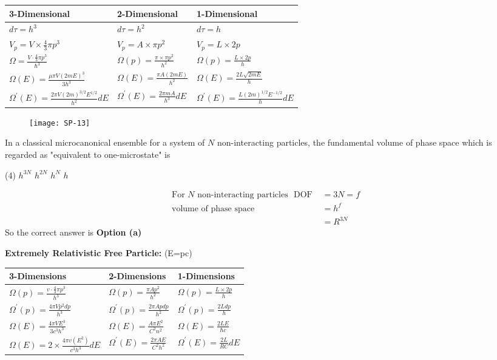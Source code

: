  \begin{tabular}{|p{4cm}|p{4cm}|p{4cm}|}
 	\hline
 3-Dimensional&2-Dimensional&1-Dimensional\\\hline
 $d \tau=h^{3}$&$d \tau=h^{2}$&$d \tau=h$\\\hline
 $V_{p}=V \times \frac{4}{3} \pi p^{3}$&$V_{p}=A \times \pi p^{2}$&$V_p=L\times2p$\\\hline
 $\Omega=\frac{V \cdot \frac{4}{3} \pi p^{3}}{\hbar^{3}}$&$\Omega(p)=\frac{\pi \times \pi p^{2}}{h^{2}}$&$\Omega(p)=\frac{L \times 2 p}{h}$\\\hline
 $\Omega(E)=\frac{\mu\pi V(2mE)^3}{3h^3}$&$\Omega(E)=\frac{\pi A(2mE)}{h^2}$&$\Omega(E)=\frac{2L\sqrt{2mE}}{h}$\\\hline
 $\Omega^{\prime}(E)=\frac{2 \pi V(2 m)^{3 / 2} E^{1 / 2}}{h^2}dE$&$\Omega^{\prime}(E)=\frac{2 \pi mA}{h^3}dE$&$\Omega^{\prime}(E)=\frac{L(2m)^{1/2}E^{-1/2}}{h}dE$\\\hline
 \end{tabular}
\begin{figure}[H]
	\texttt{[image: SP-13]}
\end{figure}
\begin{exercise}
	In a classical microcanonical ensemble for a system of $N$ non-interacting particles, the fundamental volume of phase space which is regarded as "equivalent to one-microstate" is 
\end{exercise}
 \begin{tasks}(4)
	\task[\textbf{a.}] $h^{3 N}$
	\task[\textbf{b.}]$h^{2 N}$
	\task[\textbf{c.}]$h^{N}$
	\task[\textbf{d.}]$h$
\end{tasks}
\begin{answer}
	\begin{align*}
	\text{For $N$ non-interacting particles }\text { DOF }&=3 N=f\\
	\text{volume of phase space }&=h^{f}\\
	&=R^{3 N}
	\end{align*}
	So the correct answer is \textbf{Option (a)}
\end{answer}
\textbf{Extremely Relativistic Free Particle: }(E=pc)\\
\renewcommand*{\arraystretch}{1.8}
\begin{tabular}{|p{4cm}|p{4cm}|p{4cm}|}
	\hline
	3-Dimensions & 2-Dimensions & 1-Dimensions\\\hline
	$\Omega(p)=\frac{v \cdot \frac{4}{3} \pi p^{3}}{h^{3}}$&$\Omega(p)=\frac{\pi A p^{2}}{h^{2}}$&$\Omega(p)=\frac{L \times 2 p}{h}$\\
	$\Omega^{\prime}(p)=\frac{4 \pi V p^{2} d p}{h^{3}}$&$\Omega^{\prime}(p)=\frac{2 \pi A p d p}{h^{2}}$&$\Omega^{\prime}(p)=\frac{2 L d p}{h}$\\\hline
	$\Omega(E)=\frac{4 \pi V E^{3}}{3 c^{3} h^{3}}$&$\Omega(E)=\frac{A \pi E^{2}}{C^{2} n^{2}}$&$\Omega(E)=\frac{2 L E}{\hbar c}$\\
	$\Omega(E)=2 \times \frac{4 \pi v\left(E^{2}\right)}{c^{3} h^{3}} d E$&$\Omega^{\prime}(E)=\frac{2 \pi A E}{C^{2} h^{2}}$&$\Omega^{\prime}(E)=\frac{2 L}{R C} d E$\\\hline
\end{tabular}

